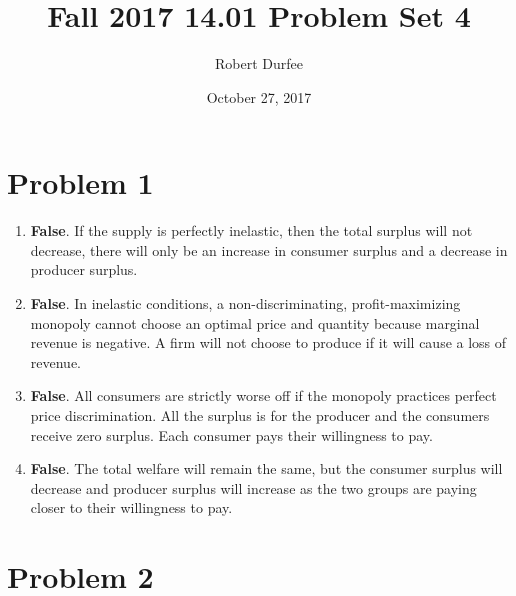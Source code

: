 \documentclass{article}
\title{Fall 2017 14.01 Problem Set 4}
\author{Robert Durfee}
\date{October 27, 2017}
\begin{document}
\maketitle

\section*{Problem 1}

\begin{enumerate}

\item \textbf{False}. If the supply is perfectly inelastic, then the total
    surplus will not decrease, there will only be an increase in consumer
    surplus and a decrease in producer surplus.

\item \textbf{False}. In inelastic conditions, a non-discriminating,
    profit-maximizing monopoly cannot choose an optimal price and quantity
    because marginal revenue is negative. A firm will not choose to produce
    if it will cause a loss of revenue.

\item \textbf{False}. All consumers are strictly worse off if the monopoly
    practices perfect price discrimination. All the surplus is for the
    producer and the consumers receive zero surplus. Each consumer pays
    their willingness to pay.

\item \textbf{False}. The total welfare will remain the same, but the consumer
    surplus will decrease and producer surplus will increase as the two
    groups are paying closer to their willingness to pay.

\end{enumerate}

\section*{Problem 2}
\end{document}
